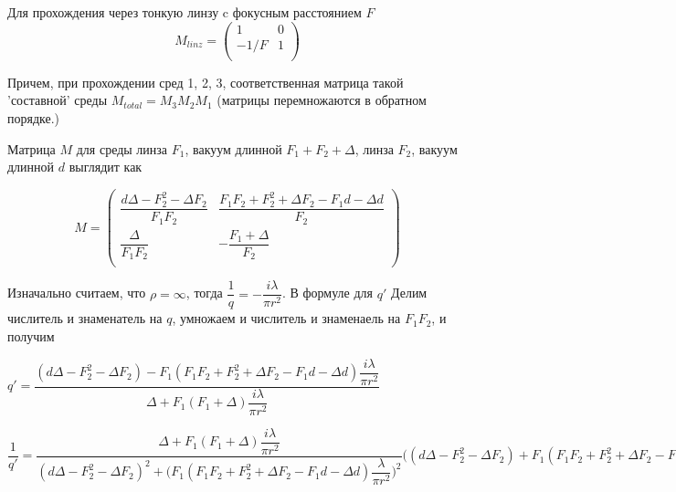 Для прохождения через тонкую линзу c фокусным расстоянием $F$
 \begin{equation*}
M_{linz} =
\begin{pmatrix}
1 & 0 \\
-1/F & 1 \\
\end{pmatrix}
\end{equation*}

Причем, при прохождении сред 1, 2, 3, соответственная матрица такой 'составной' среды $M_{total} = M_{3} M_{2} M_{1}$ (матрицы перемножаются в обратном порядке.)


Матрица $M$ для среды линза $F_{1}$, вакуум длинной $F_{1} + F_{2} + \Delta$, линза $F_{2}$, вакуум длинной $d$ выглядит как

\begin{equation*}
M =
\begin{pmatrix}
 \dfrac{d\Delta - F_{2}^2 - \Delta F_{2}}{F_{1}F_{2}} & \dfrac{F_{1}F_{2} + F_{2}^2 + \Delta F_{2} - F_{1}d- \Delta d}{F_{2}} \\
\dfrac{\Delta}{F_{1} F_{2}} & - \dfrac{F_{1} + \Delta}{F_{2}} \\
\end{pmatrix}
\end{equation*}

Изначально считаем, что $\rho = \infty$, тогда $ \dfrac{1}{q} = - \dfrac{i \lambda}{\pi r^2}$. В формуле для $q'$ Делим числитель и знаменатель на $q$, умножаем и числитель и знаменаель на $F_{1} F_{2}$, и получим

$q' = \dfrac{(d\Delta - F_{2}^2 - \Delta F_{2}) - F_{1}(F_{1}F_{2} + F_{2}^2 + \Delta F_{2} - F_{1}d- \Delta d)\dfrac{i \lambda}{\pi r^2}}{\Delta + F_{1}(F_{1} + \Delta) \dfrac{i \lambda}{\pi r^2}} $

$\dfrac{1}{q'}
=
\dfrac{\Delta + F_{1}(F_{1} + \Delta)\dfrac{i \lambda}{\pi r^2}}{(d\Delta - F_{2}^2 -\Delta F_{2})^2 + \Big(F_{1}(F_{1}F_{2} + F_{2}^2 + \Delta F_{2} - F_{1}d- \Delta d)\dfrac{ \lambda}{\pi r^2}\Big)^2} \Big((d\Delta - F_{2}^2 - \Delta F_{2}) + F_{1}(F_{1}F_{2} + F_{2}^2 + \Delta F_{2} - F_{1}d- \Delta d)\dfrac{i \lambda}{\pi r^2}\Big) 
\approx
\dfrac{\Delta + F_{1}(F_{1} + \Delta)\dfrac{i \lambda}{\pi r^2}}{(d\Delta - F_{2}^2 -\Delta F_{2})^2} \Big((d\Delta - F_{2}^2 - \Delta F_{2}) + F_{1}(F_{1}F_{2} + F_{2}^2 + \Delta F_{2} - F_{1}d- \Delta d)\dfrac{i \lambda}{\pi r^2}\Big)
=
\dfrac{1}{(d\Delta - F_{2}^2 -\Delta F_{2})^2}\Big((d\Delta - F_{2}^2 - \Delta F_{2}) + F_{1}(F_{1}F_{2} + F_{2}^2 + \Delta F_{2} - F_{1}d- \Delta d)\dfrac{i \lambda}{\pi r^2}\Big)\Big(\Delta + F_{1}(F_{1} + \Delta)\dfrac{i \lambda}{\pi r^2}\Big) \approx$ 




